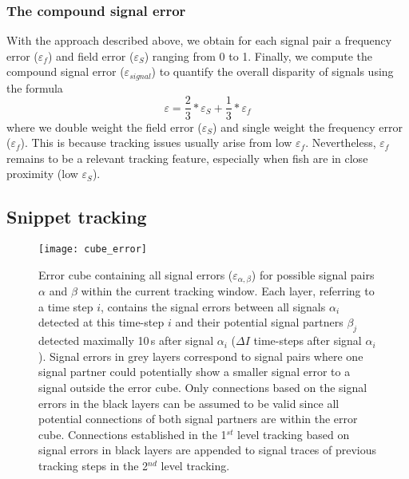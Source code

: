 \subsubsection{The compound signal error}

With the approach described above, we obtain for each signal pair a frequency error ($\varepsilon_{f}$) and field error ($\varepsilon_{S}$) ranging from 0 to 1. Finally, we compute the compound signal error ($\varepsilon_{signal}$) to quantify the overall disparity of signals using the formula
\begin{equation}\label{sig.error} 
  \varepsilon = \frac{2}{3} * \varepsilon_{S} + \frac{1}{3} * \varepsilon_{f}
\end{equation}
where we double weight the field error ($\varepsilon_{S}$) and single weight the frequency error ($\varepsilon_{f}$). This is because tracking issues usually arise from low $\varepsilon_{f}$. Nevertheless, $\varepsilon_{f}$ remains to be a relevant tracking feature, especially when fish are in close proximity (low $\varepsilon_{S}$).

\subsection{Snippet tracking}

\begin{figure}[t]
  \centerline{\texttt{[image: cube\_error]}}
  \caption{\label{error_cube} Error cube containing all signal errors ($\varepsilon_{\alpha, \beta}$) for possible signal pairs $\alpha$ and $\beta$ within the current tracking window. Each layer, referring to a time step $i$, contains the signal errors between all signals $\alpha_i$ detected at this time-step $i$ and their potential signal partners $\beta_j$ detected maximally 10\,s after signal $\alpha_i$ ($\Delta I$ time-steps after signal $\alpha_i$). Signal errors in grey layers correspond to signal pairs where one signal partner could potentially show a smaller signal error to a signal outside the error cube. Only connections based on the signal errors in the black layers can be assumed to be valid since all potential connections of both signal partners are within the error cube. Connections established in the 1$^{st}$ level tracking based on signal errors in black layers are appended to signal traces of previous tracking steps in the 2$^{nd}$ level tracking.}
\end{figure}

